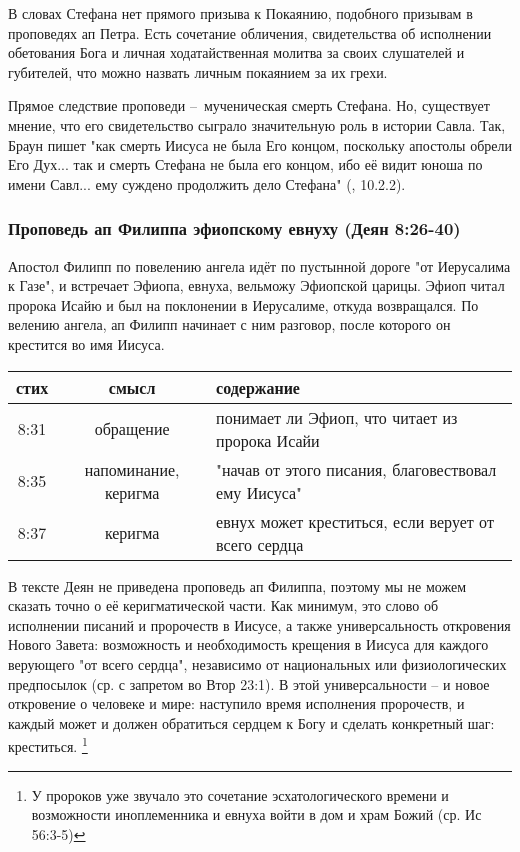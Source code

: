В словах Стефана нет прямого призыва к Покаянию, подобного призывам в проповедях ап Петра.
Есть сочетание обличения, свидетельства об исполнении обетования Бога и личная ходатайственная молитва за своих слушателей и губителей, что можно назвать личным покаянием за их грехи.

Прямое следствие проповеди – мученическая смерть Стефана.
Но, существует мнение, что его свидетельство сыграло значительную роль в истории Савла.
Так, Браун пишет "как смерть Иисуса не была Его концом, поскольку апостолы обрели Его Дух... так и смерть Стефана не была его концом, ибо её видит юноша по имени Савл... ему суждено продолжить дело Стефана" (\cite{@brown.vvedenie_1}, 10.2.2).


\subsubsection*{Проповедь ап Филиппа эфиопскому евнуху (Деян 8:26-40)}
Апостол Филипп по повелению ангела идёт по пустынной дороге "от Иерусалима к Газе", и встречает Эфиопа, евнуха, вельможу Эфиопской царицы.
Эфиоп читал пророка Исайю и был на поклонении в Иерусалиме, откуда возвращался.
По велению ангела, ап Филипп начинает с ним разговор, после которого он крестится во имя Иисуса.

\begin{center}
	\begin{longtable}{ |c|c|p{}| } 
		\hline
		стих & смысл & содержание \\
		\hline\hline
		8:31 & обращение & понимает ли Эфиоп, что читает из пророка Исайи \\
		8:35 & напоминание, керигма & "начав от этого писания, благовествовал ему Иисуса" \\
		8:37 & керигма & евнух может креститься, если верует от всего сердца \\
		\hline
	\end{longtable}
\end{center}

В тексте Деян не приведена проповедь ап Филиппа, поэтому мы не можем сказать точно о её керигматической части.
Как минимум, это слово об исполнении писаний и пророчеств в Иисусе, а также универсальность откровения Нового Завета: возможность и необходимость крещения в Иисуса для каждого верующего "от всего сердца", независимо от национальных или физиологических предпосылок (ср. с запретом во Втор 23:1).
В этой универсальности – и новое откровение о человеке и мире: наступило время исполнения пророчеств, и каждый может и должен обратиться сердцем к Богу и сделать конкретный шаг: креститься. \footnote{У пророков уже звучало это сочетание эсхатологического времени и возможности иноплеменника и евнуха войти в дом и храм Божий (ср. Ис 56:3-5)}



